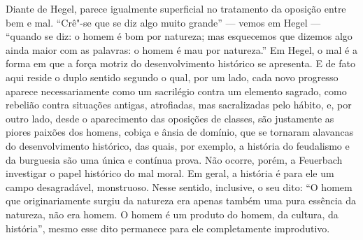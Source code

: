 Diante de
 Hegel,
parece igualmente superficial no tratamento da oposição entre bem e mal.
``Crê"-se que se diz algo muito grande'' --- vemos
em Hegel ---
``quando se diz: o homem é bom por natureza; mas esquecemos que dizemos
algo ainda maior com as palavras: o homem é mau por natureza.''
Em Hegel,
o mal é a forma em que a força motriz do desenvolvimento histórico se
apresenta. E de fato aqui reside o duplo sentido segundo o qual, por um
lado, cada novo progresso aparece necessariamente como um sacrilégio
contra um elemento sagrado, como rebelião contra situações antigas,
atrofiadas, mas sacralizadas pelo hábito, e, por outro lado, desde o
aparecimento das oposições de classes, são justamente as piores paixões
dos homens, cobiça e ânsia de domínio, que se 
tornaram alavancas do desenvolvimento histórico, das quais, por exemplo, %
a história do feudalismo e da burguesia são uma única e contínua prova.
Não ocorre, porém, a 
Feuerbach 
investigar o papel histórico do mal moral. Em geral, a história é para %
ele um campo desagradável, monstruoso. Nesse sentido, inclusive, o seu
dito: ``O homem que originariamente surgiu da natureza era apenas também
uma pura essência da natureza, não era homem. O homem é um produto do
homem, da cultura, da história'', mesmo esse
dito permanece para ele completamente improdutivo.

